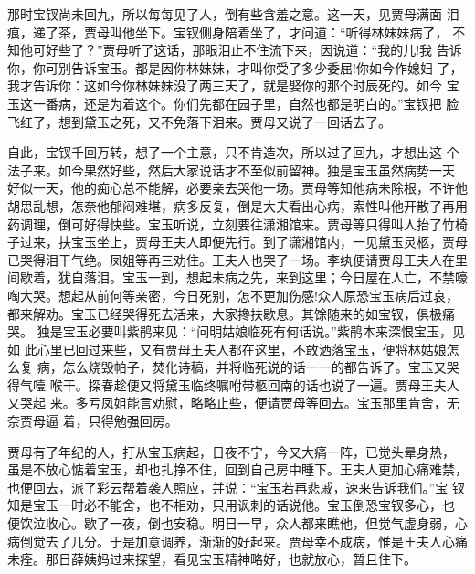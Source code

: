 那时宝钗尚未回九，所以每每见了人，倒有些含羞之意。这一天，见贾母满面
泪痕，递了茶，贾母叫他坐下。宝钗侧身陪着坐了，才问道：“听得林妹妹病了，
不知他可好些了？”贾母听了这话，那眼泪止不住流下来，因说道：“我的儿!我
告诉你，你可别告诉宝玉。都是因你林妹妹，才叫你受了多少委屈!你如今作媳妇
了，我才告诉你：这如今你林妹妹没了两三天了，就是娶你的那个时辰死的。如今
宝玉这一番病，还是为着这个。你们先都在园子里，自然也都是明白的。”宝钗把
脸飞红了，想到黛玉之死，又不免落下泪来。贾母又说了一回话去了。

自此，宝钗千回万转，想了一个主意，只不肯造次，所以过了回九，才想出这
个法子来。如今果然好些，然后大家说话才不至似前留神。独是宝玉虽然病势一天
好似一天，他的痴心总不能解，必要亲去哭他一场。贾母等知他病未除根，不许他
胡思乱想，怎奈他郁闷难堪，病多反复，倒是大夫看出心病，索性叫他开散了再用
药调理，倒可好得快些。宝玉听说，立刻要往潇湘馆来。贾母等只得叫人抬了竹椅
子过来，扶宝玉坐上，贾母王夫人即便先行。到了潇湘馆内，一见黛玉灵柩，贾母
已哭得泪干气绝。凤姐等再三劝住。王夫人也哭了一场。李纨便请贾母王夫人在里
间歇着，犹自落泪。宝玉一到，想起未病之先，来到这里；今日屋在人亡，不禁嚎
啕大哭。想起从前何等亲密，今日死别，怎不更加伤感!众人原恐宝玉病后过哀，
都来解劝。宝玉已经哭得死去活来，大家搀扶歇息。其馀随来的如宝钗，俱极痛哭。
独是宝玉必要叫紫鹃来见：“问明姑娘临死有何话说。”紫鹃本来深恨宝玉，见如
此心里已回过来些，又有贾母王夫人都在这里，不敢洒落宝玉，便将林姑娘怎么复
病，怎么烧毁帕子，焚化诗稿，并将临死说的话一一的都告诉了。宝玉又哭得气噎
喉干。探春趁便又将黛玉临终嘱咐带柩回南的话也说了一遍。贾母王夫人又哭起
来。多亏凤姐能言劝慰，略略止些，便请贾母等回去。宝玉那里肯舍，无奈贾母逼
着，只得勉强回房。

贾母有了年纪的人，打从宝玉病起，日夜不宁，今又大痛一阵，已觉头晕身热，
虽是不放心惦着宝玉，却也扎挣不住，回到自己房中睡下。王夫人更加心痛难禁，
也便回去，派了彩云帮着袭人照应，并说：“宝玉若再悲戚，速来告诉我们。”宝
钗知是宝玉一时必不能舍，也不相劝，只用讽刺的话说他。宝玉倒恐宝钗多心，也
便饮泣收心。歇了一夜，倒也安稳。明日一早，众人都来瞧他，但觉气虚身弱，心
病倒觉去了几分。于是加意调养，渐渐的好起来。贾母幸不成病，惟是王夫人心痛
未痊。那日薛姨妈过来探望，看见宝玉精神略好，也就放心，暂且住下。

